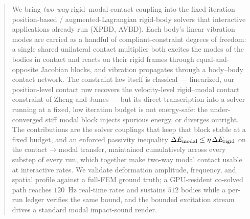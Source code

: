 \begin{abstract}
We bring \emph{two-way} rigid--modal contact coupling into the fixed-iteration
position-based / augmented-Lagrangian rigid-body solvers that interactive
applications already run (XPBD, AVBD). Each body's linear vibration modes are
carried as a handful of compliant-constraint degrees of freedom: a single
shared unilateral contact multiplier both excites the modes of the bodies in
contact and reacts on their rigid frames through equal-and-opposite Jacobian
blocks, and vibration propagates through a body--body contact network. The
constraint law itself is classical --- linearized, our position-level contact
row recovers the velocity-level rigid--modal contact constraint of Zheng and
James --- but its direct transcription into a solver running at a fixed, low
iteration budget is not energy-safe: the under-converged stiff modal block
injects spurious energy, or diverges outright. The contributions are the
solver couplings that keep that block stable at a fixed budget, and an
enforced passivity inequality $\dEmod \le \eta\,\dErig$ on the
contact$\to$modal transfer, maintained cumulatively across every substep of
every run, which together make two-way modal contact usable at interactive
rates. We validate deformation amplitude, frequency, and spatial profile
against a full-FEM ground truth; a GPU-resident co-solved path reaches
$120$~Hz real-time rates and sustains $512$ bodies while a per-run ledger
verifies the same bound, and the bounded excitation stream drives a standard
modal impact-sound render.
\end{abstract}
